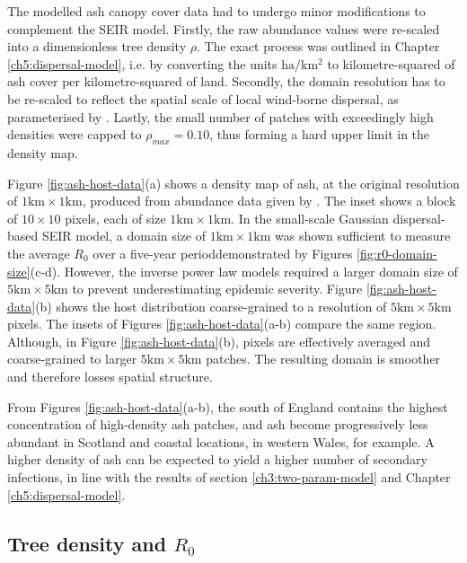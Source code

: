 The modelled ash canopy cover data had to undergo minor modifications to complement the SEIR model. 
Firstly, the raw abundance values were re-scaled into a dimensionless tree density $\rho$. 
The exact process was outlined in Chapter \ref{ch5:dispersal-model}, i.e. by converting the units $\mathrm{ha/km^2}$ to kilometre-squared
of ash cover per kilometre-squared of land. Secondly, the domain resolution has to be re-scaled to reflect the spatial scale of local 
wind-borne dispersal, as parameterised by \cite{grosdidier2018tracking}. 
Lastly, the small number of patches with exceedingly high densities were capped to $\rho_{max} = 0.10$, thus forming a hard upper limit in the density map.

Figure \ref{fig:ash-host-data}(a) shows a density map of ash, at the original resolution of
$\mathrm{1km}\times \mathrm{1km}$, produced from abundance data given by \cite{hill.data}.
The inset shows a block of $10\times10$ pixels, each of size $1\mathrm{km} \times 1 \mathrm{km}$.
In the small-scale Gaussian dispersal-based SEIR model, a domain size of $\mathrm{1km}\times \mathrm{1km}$ was shown sufficient
to measure the average $R_0$ over a five-year period\textemdash demonstrated by Figures \ref{fig:r0-domain-size}(c-d).
However, the inverse power law models required a larger domain size of $\mathrm{5km}\times \mathrm{5km}$ to prevent underestimating epidemic severity.
Figure \ref{fig:ash-host-data}(b) shows the host distribution coarse-grained to a resolution of $\mathrm{5km}\times \mathrm{5km}$ pixels.
The insets of Figures \ref{fig:ash-host-data}(a-b) compare the same region.
Although, in Figure \ref{fig:ash-host-data}(b), pixels are effectively averaged and coarse-grained to larger $5\mathrm{km} \times 5 \mathrm{km}$ patches.
The resulting domain is smoother and therefore losses spatial structure.

From Figures \ref{fig:ash-host-data}(a-b), the south of England contains the highest concentration of high-density ash patches, 
and ash become progressively less abundant in Scotland and coastal locations, in western Wales, for example. 
A higher density of ash can be expected to yield a higher number of secondary infections, 
in line with the results of section \ref{ch3:two-param-model} and Chapter \ref{ch5:dispersal-model}.

\subsection{Tree density and $R_0$}
\label{section:r0-tree-density}

